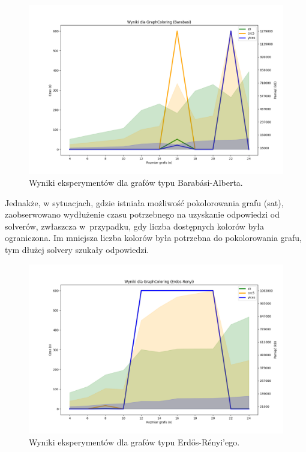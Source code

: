 \begin{figure}[htbp]
	\centering
	\begin{minipage}{\textwidth}
		\includegraphics[width=\textwidth]{./figures/6-barabasi-plot.png}
		\caption{Wyniki eksperymentów dla grafów typu Barabási-Alberta.}
		\label{fig:6-barabasi-plot}
	\end{minipage}
\end{figure}

Jednakże, w sytuacjach, gdzie istniała możliwość pokolorowania grafu (sat), zaobserwowano wydłużenie czasu potrzebnego na uzyskanie odpowiedzi od solverów, zwłaszcza w~przypadku, gdy liczba dostępnych kolorów była ograniczona. Im mniejsza liczba kolorów była potrzebna do pokolorowania grafu, tym dłużej solvery szukały odpowiedzi.

\begin{figure}[htbp]
	\centering
	\begin{minipage}{\textwidth}
		\includegraphics[width=\textwidth]{./figures/6-erdos-renyi-plot.png}
		\caption{Wyniki eksperymentów dla grafów typu Erdős-Rényi'ego.}
		\label{fig:6-erdos-renyi-plot}
	\end{minipage}
\end{figure}

